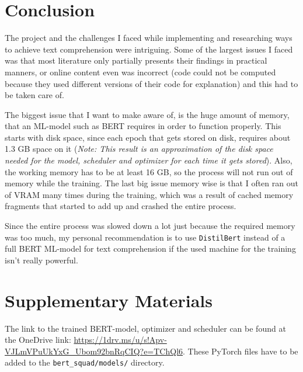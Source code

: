 
\pagebreak
    \section{Conclusion}
    \label{sec:conclusion}

        The project and the challenges I faced while implementing and researching ways to achieve text comprehension were intriguing. 
        Some of the largest issues I faced was that most literature only partially presents their findings in practical manners, or online content even was incorrect (code could not be computed because they used different versions of their code for explanation) and this had to be taken care of.

        The biggest issue that I want to make aware of, is the huge amount of memory, that an ML-model such as BERT requires in order to function properly. This starts with disk space, since each epoch that gets stored on disk, requires about 1.3 GB space on it (\emph{Note: This result is an approximation of the disk space needed for the model, scheduler and optimizer for each time it gets stored}).
        Also, the working memory has to be at least 16 GB, so the process will not run out of memory while the training.
        The last big issue memory wise is that I often ran out of VRAM many times during the training, which was a result of cached memory fragments that started to add up and crashed the entire process.

        Since the entire process was slowed down a lot just because the required memory was too much, my personal recommendation is to use \texttt{DistilBert} instead of a full BERT ML-model for text comprehension if the used machine for the training isn't really powerful.

    \section{Supplementary Materials}
    \label{sec:supplementary-materials}

        The link to the trained BERT-model, optimizer and scheduler can be found at the OneDrive link: \url{https://1drv.ms/u/s!Apv-VJLmVPuUkYxG_Ubom92bnRqCIQ?e=TChQl6}. 
        These PyTorch files have to be added to the \texttt{bert\_squad/models/} directory.


    \pagebreak

    
    


